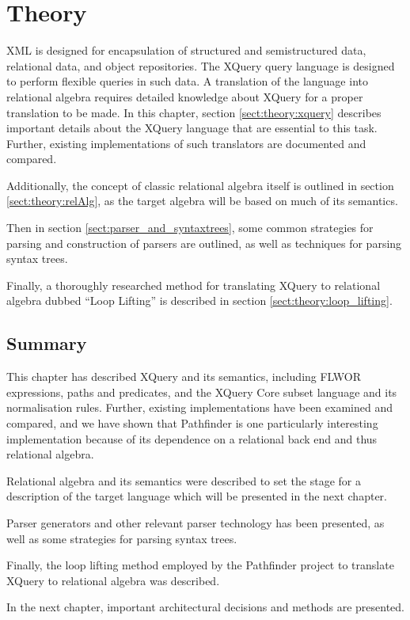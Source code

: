 \chapter{Theory}
\label{chapter:theory}
XML is designed for encapsulation of structured and semistructured data,
relational data, and object repositories. The XQuery query language is designed
to perform flexible queries in such data. A translation of the language into
relational algebra requires detailed knowledge about XQuery for a proper translation to be made. In this chapter, section
\ref{sect:theory:xquery} describes important details about the XQuery
language that are essential to this task. Further, existing implementations of
such translators are documented and compared.

Additionally, the concept of classic relational algebra itself is outlined in
section \ref{sect:theory:relAlg}, as the target algebra will be based on much
of its semantics.

Then in section \ref{sect:parser_and_syntaxtrees}, some common strategies for
parsing and construction of parsers are outlined, as well as techniques for
parsing syntax trees.

Finally, a thoroughly researched method for translating XQuery to relational
algebra dubbed ``Loop Lifting'' is described in section \ref{sect:theory:loop_lifting}.







\section{Summary}
\label{sect:theory:summary}
This chapter has described XQuery and its semantics, including FLWOR
expressions, paths and predicates, and the XQuery Core subset language and its
normalisation rules. Further, existing implementations have been examined and
compared, and we have shown that Pathfinder is one particularly interesting
implementation because of its dependence on a relational back end and thus
relational algebra.

Relational algebra and its semantics were described to set the stage for a
description of the target language which will be presented in the next chapter.

Parser generators and other relevant parser technology has been presented, as
well as some strategies for parsing syntax trees.

Finally, the loop lifting method employed by the Pathfinder project to
translate XQuery to relational algebra was described.

In the next chapter, important architectural decisions and methods are
presented.